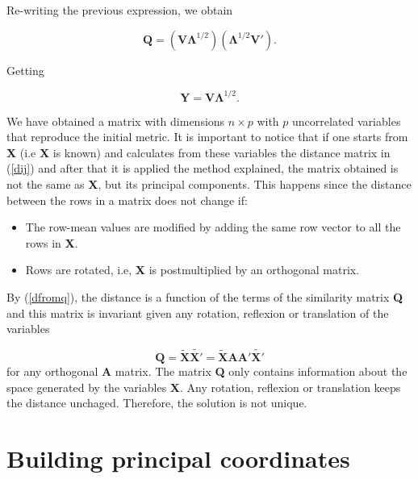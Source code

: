 \documentclass[11pt]{report}
\begin{document}
\indent Re-writing the previous expression, we obtain

\begin{equation} \label{generalQ}
\mathbf{Q} = (\mathbf{V}\mathbf{\Lambda}^{1/2})(\mathbf{\Lambda}^{1/2}\mathbf{V'}).
\end{equation}

Getting

\[
\mathbf{Y} = \mathbf{V}\mathbf{\Lambda}^{1/2}.
\]

We have obtained a matrix with dimensions $n \times p$ with $p$ uncorrelated
variables that reproduce the initial metric. It is important to notice that if 
one starts from \textbf{X} (i.e \textbf{X} is known) and calculates from these
variables the distance matrix in (\ref{dij}) and after that it is applied
the method explained, the matrix obtained is not the same as \textbf{X}, but
its principal components. This happens since the distance between the rows in
a matrix does not change if:

\begin{itemize}
\item The row-mean values are modified by adding the same row vector to all
the rows in \textbf{X}.
\item Rows are rotated, i.e, \textbf{X} is postmultiplied by an orthogonal 
matrix.
\end{itemize}

\indent By (\ref{dfromq}), the distance is a function of the terms of the 
similarity matrix \textbf{Q} and this matrix is invariant given any rotation,
reflexion or translation of the variables

\[
\mathbf{Q} = \mathbf{\widetilde{X}} \mathbf{\widetilde{X'}} = \mathbf{\widetilde{X}} \mathbf{A} \mathbf{A'}\mathbf{\widetilde{X'}}
\]
for any orthogonal \textbf{A} matrix. The matrix \textbf{Q} only contains 
information about the space generated by the variables \textbf{X}. Any rotation,
reflexion or translation keeps the distance unchaged. Therefore, the solution
is not unique.


\section{Building principal coordinates}
\end{document}
